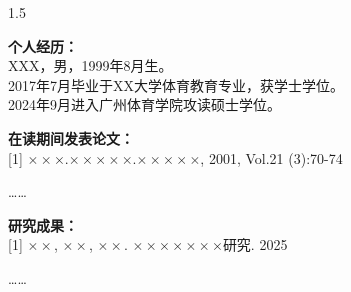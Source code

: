 \documentclass[UTF8,zihao=-4,twoside,openany]{ctexbook}
\newcommand{\studentname}{XXX}          %
\newcommand{\birthyear}{1999}           %
\newcommand{\birthmonth}{8}             %
\newcommand{\undergradschool}{XX大学}   %
\newcommand{\undergradmajor}{体育教育}  %
\begin{document}
\begin{spacing}{1.5}
{\fangsong\fontsize{12pt}{12pt}\selectfont
\noindent \textbf{个人经历：}\\
\studentname，男，\birthyear 年\birthmonth 月生。\\
2017年7月毕业于\undergradschool\undergradmajor 专业，获学士学位。\\
2024年9月进入广州体育学院攻读硕士学位。

\vspace{0.4cm}
\noindent \textbf{在读期间发表论文：}\\
{[1]} $\times\times\times$.$\times\times\times\times\times$.$\times\times\times\times\times$, 2001, Vol.21 (3):70-74

\vspace{0.4cm}
……

\vspace{0.4cm}
\noindent \textbf{研究成果：}\\
{[1]} $\times\times$, $\times\times$, $\times\times$. $\times\times\times\times\times\times\times$研究. 2025

\vspace{0.4cm}
……
}
\end{spacing}
\end{document}
